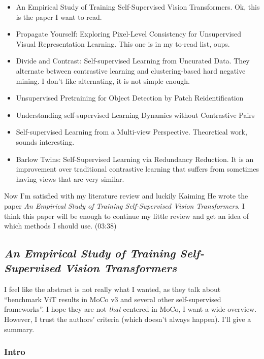 \documentclass[
]{article}
\begin{document}
\begin{itemize}
\item
  An Empirical Study of Training Self-Supervised Vision Transformers.
  Ok, this is the paper I want to read.
\item
  Propagate Yourself: Exploring Pixel-Level Consistency for Unsupervised
  Visual Representation Learning. This one is in my to-read list, oups.
\item
  Divide and Contrast: Self-supervised Learning from Uncurated Data.
  They alternate between contrastive learning and clustering-based hard
  negative mining. I don't like alternating, it is not simple enough.
\item
  Unsupervised Pretraining for Object Detection by Patch
  Reidentification
\item
  Understanding self-supervised Learning Dynamics without Contrastive
  Pairs
\item
  Self-supervised Learning from a Multi-view Perspective. Theoretical
  work, sounds interesting.
\item
  Barlow Twins: Self-Supervised Learning via Redundancy Reduction. It is
  an improvement over traditional contrastive learning that suffers from
  sometimes having views that are very similar.
\end{itemize}

Now I'm satisfied with my literature review and luckily Kaiming He wrote
the paper \emph{An Empirical Study of Training Self-Supervised Vision
Transformers}. I think this paper will be enough to continue my little
review and get an idea of which methods I should use. (03:38)

\hypertarget{an-empirical-study-of-training-self-supervised-vision-transformers}{%
\subsection{\texorpdfstring{\emph{An Empirical Study of Training
Self-Supervised Vision
Transformers}}{An Empirical Study of Training Self-Supervised Vision Transformers}}\label{an-empirical-study-of-training-self-supervised-vision-transformers}}

I feel like the abstract is not really what I wanted, as they talk about
``benchmark ViT results in MoCo v3 and several other self-supervised
frameworks''. I hope they are not \emph{that} centered in MoCo, I want a
wide overview. However, I trust the authors' criteria (which doesn't
always happen). I'll give a summary.

\hypertarget{intro}{%
\subsubsection{Intro}\label{intro}}
\end{document}
